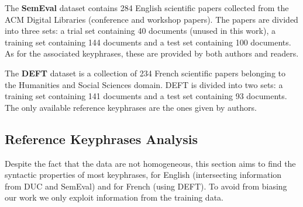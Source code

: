     The \textbf{SemEval} dataset \cite{kim2010semeval} contains 284 English
    scientific papers collected from the ACM Digital Libraries (conference and
    workshop papers). The papers are divided into three sets: a trial set
    containing 40 documents (unused in this work), a training set containing 144
    documents and a test set containing 100 documents. As for the associated
    keyphrases, these are provided by both authors and readers.

    The \textbf{DEFT} dataset \cite{Paroubek2012deft} is a collection of 234
    French scientific papers belonging to the Humanities and Social Sciences
    domain. DEFT is divided into two sets: a training set containing 141
    documents and a test set containing 93 documents. The only available
    reference keyphrases are the ones given by authors.

  \subsection{Reference Keyphrases Analysis}
  \label{subsec:keyphrase_analysis}
    Despite the fact that the data are not homogeneous, this section aims to
    find the syntactic properties of most keyphrases, for English (intersecting
    information from DUC and SemEval) and for French (using DEFT). To avoid from
    biasing our work we only exploit information from the training data.

